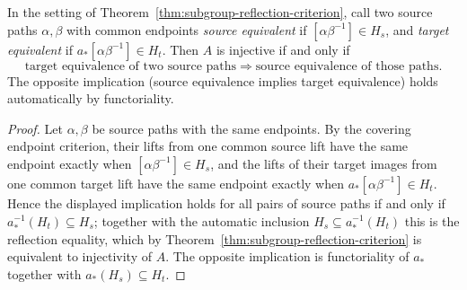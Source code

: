 \begin{corollary}
\label{cor:path-reflection}
In the setting of Theorem~\ref{thm:subgroup-reflection-criterion}, call
two source paths \(\alpha,\beta\) with common endpoints \emph{source
equivalent} if \([\alpha\beta^{-1}]\in H_s\), and \emph{target
equivalent} if \(a_*[\alpha\beta^{-1}]\in H_t\).  Then \(A\) is
injective if and only if
\[
 \text{target equivalence of two source paths}
 \Longrightarrow
 \text{source equivalence of those paths}.
\]
The opposite implication (source equivalence implies target
equivalence) holds automatically by functoriality.
\end{corollary}

\begin{proof}
Let \(\alpha,\beta\) be source paths with the same endpoints.  By the
covering endpoint criterion, their lifts from one common source lift
have the same endpoint exactly when \([\alpha\beta^{-1}]\in H_s\), and
the lifts of their target images from one common target lift have the
same endpoint exactly when \(a_*[\alpha\beta^{-1}]\in H_t\).  Hence the
displayed implication holds for all pairs of source paths if and only
if \(a_*^{-1}(H_t)\subseteq H_s\); together with the automatic
inclusion \(H_s\subseteq a_*^{-1}(H_t)\) this is the reflection
equality, which by Theorem~\ref{thm:subgroup-reflection-criterion} is
equivalent to injectivity of \(A\).  The opposite implication is
functoriality of \(a_*\) together with \(a_*(H_s)\subseteq H_t\).
\end{proof}